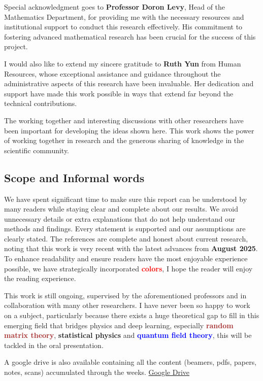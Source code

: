 \documentclass[a4paper]{article}
\theoremstyle{plain}
\theoremstyle{definition}
\theoremstyle{remark}
\begin{document}
Special acknowledgment goes to \textbf{Professor Doron Levy}, Head of the Mathematics Department, for providing me with the necessary resources and institutional support to conduct this research effectively. His commitment to fostering advanced mathematical research has been crucial for the success of this project.

I would also like to extend my sincere gratitude to \textbf{Ruth Yun} from Human Resources, whose exceptional assistance and guidance throughout the administrative aspects of this research have been invaluable. Her dedication and support have made this work possible in ways that extend far beyond the technical contributions.


The working together and interesting discussions with other researchers have been important for developing the ideas shown here. This work shows the power of working together in research and the generous sharing of knowledge in the scientific community.


\subsection*{Scope and Informal words}

We have spent significant time to make sure this report can be understood by many readers while staying clear and complete about our results. We avoid unnecessary details or extra explanations that do not help understand our methods and findings. 
Every statement is supported and our assumptions are clearly stated. The references are complete and honest about current research, 
noting that this work is very recent with the latest advances from \textbf{August 2025}.
To enhance readability and ensure readers have the most enjoyable experience possible, we have strategically 
incorporated \textbf{\textcolor{red}{colors}}, I hope the reader will enjoy the reading experience.

This work is still ongoing, supervised by the aforementioned professors and in collaboration with many other researchers.
 I have never been so happy to work on a subject,
particularly because there exists a huge theoretical gap to fill in this emerging field that bridges physics and deep learning,
especially \textbf{\textcolor{brown}{random matrix theory}}, \textbf{\textcolor{darkyellow}{statistical physics}} and \textbf{\textcolor{blue}{quantum field theory}}, this will be tackled in the oral presentation.


A google drive is also available containing all the content (beamers, pdfs, papers, notes, scans) accumulated through the weeks.
\href{https://drive.google.com/drive/folders/1-00000000000000000000000000000000000000000}{Google Drive}
\end{document}
